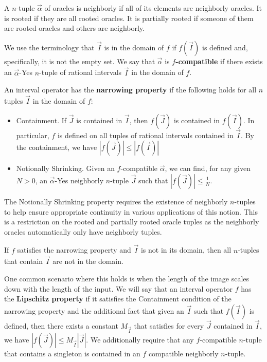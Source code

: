 \documentclass[12pt]{article}
\begin{document}
A $n$-tuple $\vec{\alpha}$ of oracles is neighborly if all of its elements are neighborly oracles. It is rooted if they are all rooted oracles. It is partially rooted if someone of them are rooted oracles and others are neighborly. 

We use the terminology that $\vec{I}$ is in the domain of $f$ if $f(\vec{I})$ is defined and, specifically, it is not the empty set. We say that $\vec{\alpha}$ is \textbf{$f$-compatible} if there exists an $\vec{\alpha}$-Yes $n$-tuple of rational intervals $\vec{I}$ in the domain of $f$. 

An interval operator has the \textbf{narrowing property} if the following holds for all $n$ tuples $\vec{I}$ in the domain of $f$:
\begin{itemize}
    \item Containment. If $\vec{J}$ is contained in $\vec{I}$, then $f(\vec{J})$ is contained in $f(\vec{I})$. In particular, $f$ is defined on all tuples of rational intervals contained in $\vec{I}$. By the containment, we have $|f(\vec{J})| \leq |f(\vec{I})|$
    \item Notionally Shrinking. Given an $f$-compatible $\vec{\alpha}$, we can find, for any given $N>0$, an $\vec{\alpha}$-Yes neighborly $n$-tuple $\vec{J}$  such that $|f(\vec{J})| \leq \frac{1}{N}$. 
\end{itemize}

The Notionally Shrinking property requires the existence of neighborly $n$-tuples to help ensure appropriate continuity in various applications of this notion. This is a restriction on the rooted and partially rooted oracle tuples as the neighborly oracles automatically only have neighborly tuples. 

If $f$ satisfies the narrowing property and $\vec{I}$ is not in its domain, then all $n$-tuples that contain $\vec{I}$ are not in the domain. 

One common scenario where this holds is when the length of the image scales down with the length of the input. We will say that an interval operator $f$ has the \textbf{Lipschitz property} if it satisfies the Containment condition of the narrowing property and the additional fact that given an $\vec{I}$ such that $f(\vec{I})$ is defined, then there exists a constant $M_{\vec{I}}$ that satisfies for every $\vec{J}$ contained in $\vec{I}$, we have $|f(\vec{J})| \leq M_{\vec{I}} |\vec{J}|$. We additionally require that any $f$-compatible $n$-tuple that contains a singleton is contained in an $f$  compatible neighborly $n$-tuple. 
\end{document}
